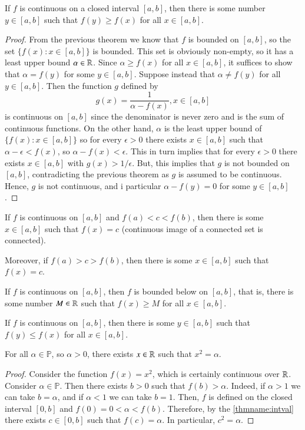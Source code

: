 \documentclass[12pt, a4paper, oneside, openright, titlepage]{book}
\begin{document}
\begin{thm}
    If $f$ is continuous on a closed interval $[a,b]$, then there is some number $y \in [a,b]$ such that $f(y) \geq f(x)$ for all $x \in [a,b]$.
\end{thm}
\begin{proof}
    From the previous theorem we know that $f$ is bounded on $[a,b]$, so the set $\{f(x):x\in[a,b]\}$ is bounded. This set is obviously non-empty, so it has a least upper bound $\alpha \in \mathbb R$. Since $\alpha \geq f(x)$ for all $x \in [a,b]$, it suffices to show that $\alpha = f(y)$ for some $y \in [a,b]$. Suppose instead that $\alpha \neq f(y)$ for all $y \in [a,b]$. Then the function $g$ defined by $$g(x) = \frac{1}{\alpha - f(x)}, x \in [a,b]$$ is continuous on $[a,b]$ since the denominator is never zero and is the sum of continuous functions. On the other hand, $\alpha$ is the least upper bound of $\{f(x):x\in [a,b]\}$ so for every $\epsilon > 0$ there exists $x \in [a,b]$ such that $\alpha - \epsilon < f(x)$, so $\alpha - f(x) < \epsilon$. This in turn implies that for every $\epsilon > 0$ there exists $x \in [a,b]$ with $g(x) > 1/\epsilon$. But, this implies that $g$ is not bounded on $[a,b]$, contradicting the previous theorem as $g$ is assumed to be continuous. Hence, $g$ is not continuous, and i particular $\alpha - f(y) = 0$ for some $y \in [a,b]$.
\end{proof}


\begin{namthm}\label{thmname:intval}
    If $f$ is continuous on $[a,b]$ and $f(a) < c < f(b)$, then there is some $x \in [a,b]$ such that $f(x) = c$ (continuous image of a connected set is connected).

    Moreover, if $f(a) > c > f(b)$, then there is some $x \in [a,b]$ such that $f(x) = c$.
\end{namthm}

\begin{thm}
    If $f$ is continuous on $[a,b]$, then $f$ is bounded below on $[a,b]$, that is, there is some number $M \in \mathbb R$ such that $f(x) \geq M$ for all $x \in [a,b]$.
\end{thm}

\begin{thm}
    If $f$ is continuous on $[a,b]$, then there is some $y \in [a,b]$ such that $f(y) \leq f(x)$ for all $x \in [a,b]$.
\end{thm}


\begin{cor}
    For all $\alpha \in \mathbb{P}$, so $\alpha >0$, there exists $x \in \mathbb R$ such that $x^2 = \alpha$.
\end{cor}
\begin{proof}
    Consider the function $f(x) = x^2$, which is certainly continuous over $\mathbb R$. Consider $\alpha \in \mathbb{P}$. Then there exists $b > 0$ such that $f(b) > \alpha$. Indeed, if $\alpha > 1$ we can take $b = \alpha$, and if $\alpha < 1$ we can take $b = 1$. Then, $f$ is defined on the closed interval $[0,b]$ and $f(0) = 0 < \alpha < f(b)$. Therefore, by the \ref{thmname:intval} there exists $c \in [0,b]$ such that $f(c) = \alpha$. In particular, $c^2 = \alpha$.
\end{proof}
\end{document}
